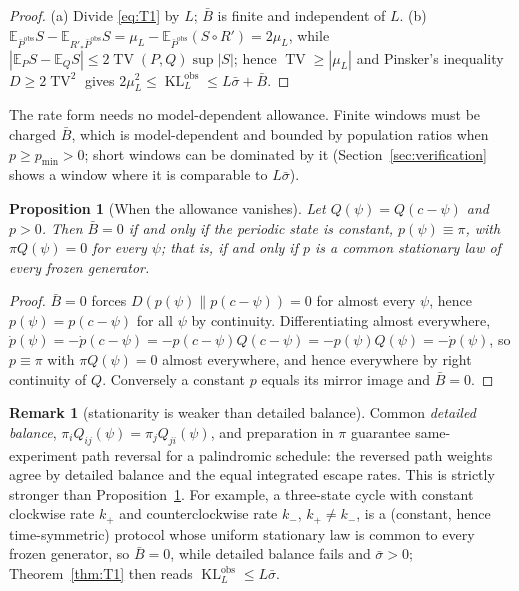 \documentclass[10pt]{article}
\newtheorem{proposition}[theorem]{Proposition}
\theoremstyle{definition}
\newtheorem{remark}[theorem]{Remark}
\DeclareMathOperator{\KL}{KL}
\DeclareMathOperator{\TV}{TV}
\newcommand{\sbar}{\bar\sigma}
\newcommand{\Bbar}{\bar B}
\newcommand{\Pbar}{\bar P}
\newcommand{\Rrec}{R'}
\newcommand{\E}{\mathbb E}
\begin{document}
\begin{proof}
(a) Divide \eqref{eq:T1} by $L$; $\Bbar$ is finite and independent of $L$.
(b) $\E_{\Pbar^{\mathrm{obs}}}S-\E_{\Rrec_*\Pbar^{\mathrm{obs}}}S
=\mu_L-\E_{\Pbar^{\mathrm{obs}}}(S\circ\Rrec)=2\mu_L$, while
$|\E_PS-\E_QS|\leq2\TV(P,Q)\sup|S|$; hence $\TV\geq|\mu_L|$ and Pinsker's
inequality $D\geq2\TV^2$ gives $2\mu_L^2\leq\KL^{\mathrm{obs}}_L\leq L\sbar+\Bbar$.
\end{proof}

The rate form needs no model-dependent
allowance.  Finite windows must be charged $\Bbar$, which is
model-dependent and bounded by population ratios when $p\geq p_{\min}>0$;
short windows can be dominated by it (Section~\ref{sec:verification}
shows a window where it is comparable to $L\sbar$).

\begin{proposition}[When the allowance vanishes]
\label{prop:Bbar-zero}
Let $Q(\psi)=Q(c-\psi)$ and $p>0$.  Then $\Bbar=0$ if and only if the
periodic state is constant, $p(\psi)\equiv\pi$, with $\pi Q(\psi)=0$ for
every $\psi$; that is, if and only if $p$ is a common stationary law of
every frozen generator.
\end{proposition}

\begin{proof}
$\Bbar=0$ forces $D(p(\psi)\|p(c-\psi))=0$ for almost every $\psi$, hence
$p(\psi)=p(c-\psi)$ for all $\psi$ by continuity. Differentiating almost everywhere,
$\dot p(\psi)=-\dot p(c-\psi)=-p(c-\psi)Q(c-\psi)=-p(\psi)Q(\psi)=-\dot p(\psi)$,
so $p\equiv\pi$ with $\pi Q(\psi)=0$ almost everywhere, and hence
everywhere by right continuity of $Q$.
Conversely a constant $p$ equals its mirror image and $\Bbar=0$.
\end{proof}

\begin{remark}[stationarity is weaker than detailed balance]
\label{rem:stationarity}
Common \emph{detailed balance},
$\pi_iQ_{ij}(\psi)=\pi_jQ_{ji}(\psi)$, and preparation in $\pi$
guarantee same-experiment path reversal for a palindromic schedule:
the reversed path weights agree by detailed balance and the equal integrated
escape rates. This is strictly stronger than
Proposition~\ref{prop:Bbar-zero}. For example, a three-state cycle with
constant clockwise rate $k_+$ and
counterclockwise rate $k_-$, $k_+\neq k_-$, is a (constant, hence
time-symmetric) protocol whose uniform stationary law is common to every
frozen generator, so $\Bbar=0$, while detailed balance fails and
$\sbar>0$; Theorem~\ref{thm:T1} then reads $\KL^{\mathrm{obs}}_L\leq L\sbar$.
\end{remark}
\end{document}
